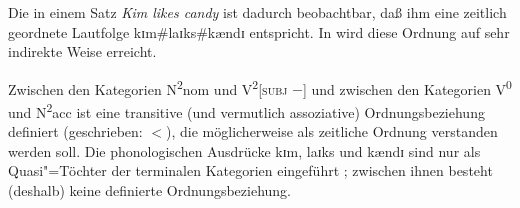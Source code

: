 \documentclass[output=paper]{LSP/langsci}
\begin{document}
{\randnum}Die  in einem Satz
\textit{Kim likes candy} ist dadurch beobachtbar, daß ihm eine
zeitlich geordnete Lautfolge {kɪm\#laɪks\#kændɪ} entspricht. In
 wird diese Ordnung auf sehr indirekte Weise erreicht.
\pagebreak
\begin{exe}
\extab
{}
\end{exe}
{\randnum}Zwischen den Kategorien
N\textsuperscript{2}nom und V\textsuperscript{2}[\textsc{subj} $-$] und
zwischen den Kategorien V\textsuperscript{0} und N\textsuperscript{2}acc ist eine
transitive (und vermutlich assoziative) 
Ordnungsbeziehung definiert (geschrieben: $<$), die möglicherweise als
  zeitliche Ordnung verstanden werden soll. Die phonologischen
  Ausdrücke {kɪm}, {laɪks} und {kændɪ} sind nur als Quasi"=Töchter der
  terminalen Kategorien eingeführt \citep[104]{gazdaretal1985a}; zwischen ihnen
  besteht (deshalb) keine definierte Ordnungsbeziehung.
\end{document}

